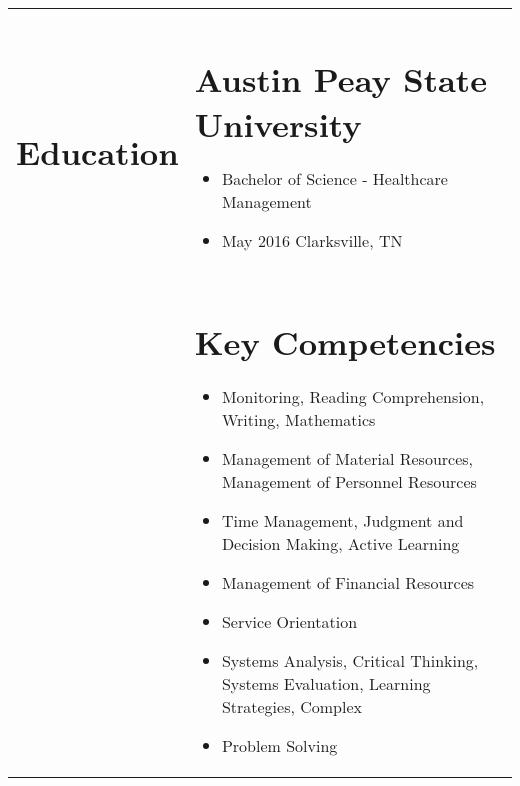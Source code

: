 \documentclass[10pt]{article} %
\begin{document}
\LARGE\noindent{}
\normalsize
\noindent{}
\noindent{}
\noindent{}
\noindent{}


\hrulefill
\renewcommand\arraystretch{0.1}
\begin{tabularx}{\textwidth}{p{3cm} X}

\section*{Education} & \section*{Austin Peay State University}
\begin{itemize}
\setlength{\itemsep}{1pt}
\item[] Bachelor of Science - Healthcare Management
\item[] May 2016 Clarksville, TN
\end{itemize}\\

\section*{}
& \section*{Key Competencies}
\begin{itemize}
\setlength{\itemsep}{1pt}
\item Monitoring, Reading Comprehension, Writing, Mathematics
\item Management of Material Resources, Management of Personnel Resources
\item Time Management, Judgment and Decision Making, Active Learning
\item Management of Financial Resources
\item Service Orientation
\item Systems Analysis, Critical Thinking, Systems Evaluation, Learning Strategies, Complex
\item Problem Solving
\end{itemize}


\end{tabularx}
\end{document}
